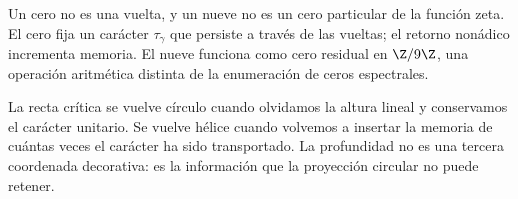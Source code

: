 Un cero no es una vuelta, y un nueve no es un cero particular de la función
zeta. El cero fija un carácter \(\tau_\gamma\) que persiste a través de las
vueltas; el retorno nonádico incrementa memoria. El nueve funciona como cero
residual en \(\Z/9\Z\), una operación aritmética distinta de la enumeración
de ceros espectrales.

\begin{narrativebox}
La recta crítica se vuelve círculo cuando olvidamos la altura lineal y
conservamos el carácter unitario. Se vuelve hélice cuando volvemos a insertar
la memoria de cuántas veces el carácter ha sido transportado. La profundidad
no es una tercera coordenada decorativa: es la información que la proyección
circular no puede retener.
\end{narrativebox}
